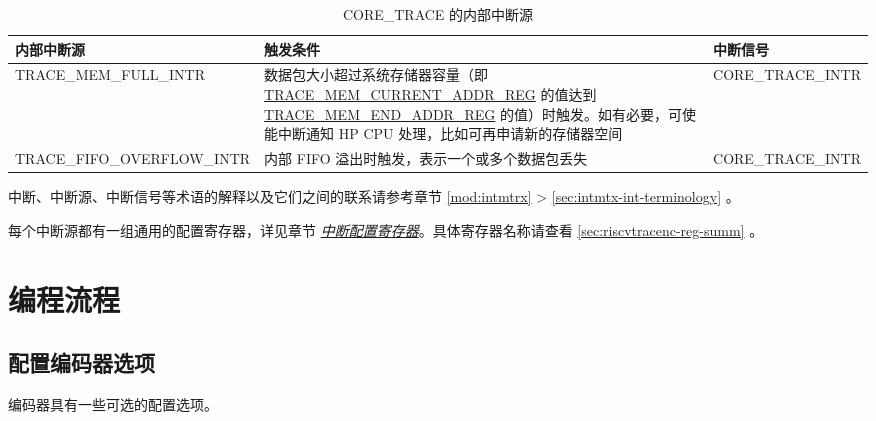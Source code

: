 \documentclass[main\_\_CN.tex]{subfiles}
\begin{document}
\begin{longtable}{ | L{5cm} | L{7cm} | L{3.5cm} | }
\caption{CORE\_TRACE 的内部中断源}
\label{tab:riscvtracenc-int-sources}
\\ \hline
{}
\textbf{内部中断源} & \textbf{触发条件}  &  \textbf{中断信号}\\ \hline

TRACE\_MEM\_FULL\_INTR & 数据包大小超过系统存储器容量（即 \hyperref[regdesc:TRACEMEMCURRENTADDRREG]{TRACE\_MEM\_CURRENT\_ADDR\_REG} 的值达到 \hyperref[regdesc:TRACEMEMENDADDRREG]{TRACE\_MEM\_END\_ADDR\_REG} 的值）时触发。如有必要，可使能中断通知 HP CPU 处理，比如可再申请新的存储器空间 & CORE\_TRACE\_INTR \\\hline

TRACE\_FIFO\_OVERFLOW\_INTR & 内部 FIFO 溢出时触发，表示一个或多个数据包丢失 & CORE\_TRACE\_INTR \\\hline

\end{longtable}

\begin{tiplisting}
中断、中断源、中断信号等术语的解释以及它们之间的联系请参考章节 \ref{mod:intmtrx} \textit{} > \ref{sec:intmtx-int-terminology} \textit{}。
\end{tiplisting}

每个中断源都有一组通用的配置寄存器，详见章节 \hyperref[interrupt-config-registers]{\textit{中断配置寄存器}}。具体寄存器名称请查看 \ref{sec:riscvtracenc-reg-summ} \textit{}。



\section{编程流程}
\label{sec:riscvtracenc-prog-procedures}

\subsection{配置编码器选项}

编码器具有一些可选的配置选项。
\end{document}
